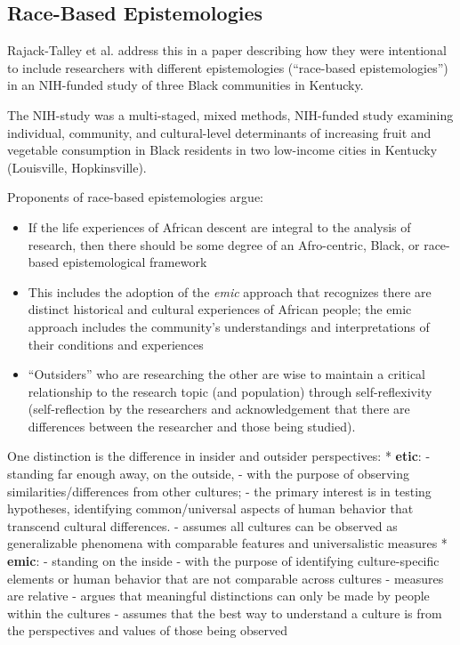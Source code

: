 \documentclass[
  english,
]{book}
\providecommand{\tightlist}{%
  \setlength{\itemsep}{0pt}\setlength{\parskip}{0pt}}
\begin{document}
\hypertarget{race-based-epistemologies}{%
\subsection{Race-Based Epistemologies}\label{race-based-epistemologies}}

Rajack-Talley et al. \citeyearpar{rajack-talley_epistemological_2017} address this in a paper describing how they were intentional to include researchers with different epistemologies (``race-based epistemologies'') in an NIH-funded study of three Black communities in Kentucky.

The NIH-study \citep{della_modeling_2016} was a multi-staged, mixed methods, NIH-funded study examining individual, community, and cultural-level determinants of increasing fruit and vegetable consumption in Black residents in two low-income cities in Kentucky (Louisville, Hopkinsville).

Proponents of race-based epistemologies argue:

\begin{itemize}
\tightlist
\item
  If the life experiences of African descent are integral to the analysis of research, then there should be some degree of an Afro-centric, Black, or race-based epistemological framework
\item
  This includes the adoption of the \emph{emic} approach that recognizes there are distinct historical and cultural experiences of African people; the emic approach includes the community's understandings and interpretations of their conditions and experiences
\item
  ``Outsiders'' who are researching the other are wise to maintain a critical relationship to the research topic (and population) through self-reflexivity (self-reflection by the researchers and acknowledgement that there are differences between the researcher and those being studied).
\end{itemize}

One distinction is the difference in insider and outsider perspectives:
* \textbf{etic}:
- standing far enough away, on the outside,
- with the purpose of observing similarities/differences from other cultures;
- the primary interest is in testing hypotheses, identifying common/universal aspects of human behavior that transcend cultural differences.
- assumes all cultures can be observed as generalizable phenomena with comparable features and universalistic measures
* \textbf{emic}:
- standing on the inside
- with the purpose of identifying culture-specific elements or human behavior that are not comparable across cultures
- measures are relative
- argues that meaningful distinctions can only be made by people within the cultures
- assumes that the best way to understand a culture is from the perspectives and values of those being observed
\end{document}
